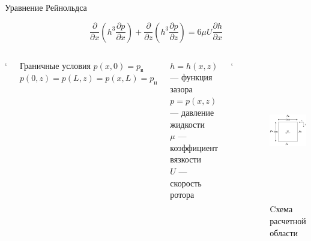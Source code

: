 \documentclass[ignoreonframetext,unicode]{beamer}
\begin{document}
	\begin{frame}{Уравнение Рейнольдса}
		
		\begin{block}{}
			\[
			\frac{\partial}{\partial x} \left(h^3 \frac{\partial p}{\partial x} \right) + \frac{\partial}{\partial z} \left(h^3 \frac{\partial p}{\partial z} \right) = 6 \mu U \frac{\partial h}{\partial x}
			\]
		\end{block}
		
		\vspace*{-10mm}
		\begin{columns}
	
		`
			\begin{block}{Граничные условия}
				$p(x, 0) = p_{\text{в}}$\\ 
				$p(0, z) = p(L, z) = p(x, L) = p_{\text{н}}$
			\end{block}
			\begin{block}{}
			$h = h(x, z)$ --- функция зазора \\
			$p = p(x, z)$ --- давление жидкости \\
			$\mu$ --- коэффициент вязкости \\
			$U$ --- скорость ротора
			\end{block}

	
	`
	\begin{figure}[!htbp]
	\centering
	\includegraphics[width=1\textwidth, height=1\textwidth]{taskGU}%
	\caption{Cхема расчетной области}
	\vspace*{-2mm}
	\label{ser_graph}
\end{figure}

		\end{columns}
		
		
		
	\end{frame}	
\end{document}
